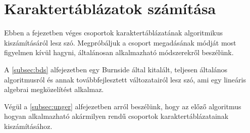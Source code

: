 \section{Karaktertáblázatok számítása}
\label{sec:karakter}
Ebben a fejezetben véges csoportok karaktertáblázatának algoritmikus kiszámításáról lesz szó.
Megpróbáljuk a csoport megadásának módját most figyelmen kívül hagyni, általánosan alkalmazható
módszerekről beszélünk.

A \ref{subsec:bds} alfejezetben egy Burnside által kitalált, teljesen általános algoritmusról
és annak továbbfejlesztett változatairól lesz szó, ami egy lineáris algebrai megközelítést alkalmaz.


Végül a \ref{subsec:unger} alfejezetben arról beszélünk, hogy az előző algoritmus hogyan alkalmazható
akármilyen rendű csoportok karaktertáblázatainak kiszámításához.





\clearpage
